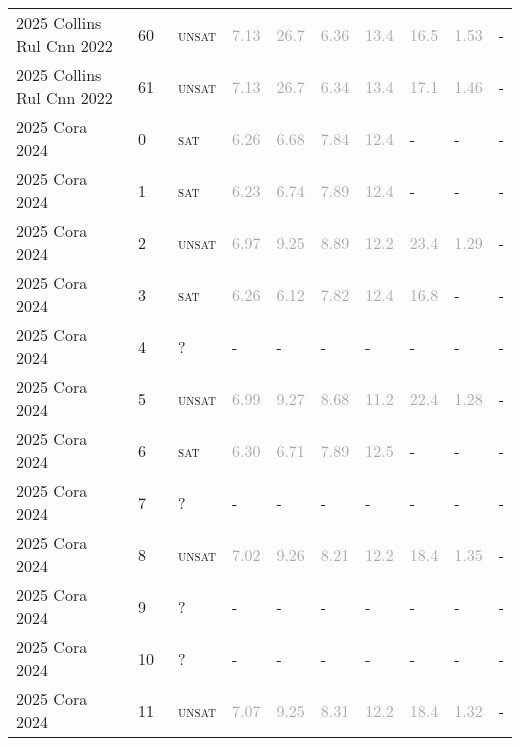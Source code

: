 \begin{center}
{\begin{longtable}{@{}llllllllll@{}}
2025 Collins Rul Cnn 2022 & 60 & ~\textsc{unsat} & \textcolor{darkgray}{7.13} & \textcolor{darkgray}{26.7} & \textcolor{darkgray}{6.36} & \textcolor{darkgray}{13.4} & \textcolor{darkgray}{16.5} & \textcolor{darkgray}{1.53} & - \\
2025 Collins Rul Cnn 2022 & 61 & ~\textsc{unsat} & \textcolor{darkgray}{7.13} & \textcolor{darkgray}{26.7} & \textcolor{darkgray}{6.34} & \textcolor{darkgray}{13.4} & \textcolor{darkgray}{17.1} & \textcolor{darkgray}{1.46} & - \\
\midrule
2025 Cora 2024 & 0 & ~\textsc{sat} & \textcolor{darkgray}{6.26} & \textcolor{darkgray}{6.68} & \textcolor{darkgray}{7.84} & \textcolor{darkgray}{12.4} & - & - & - \\
2025 Cora 2024 & 1 & ~\textsc{sat} & \textcolor{darkgray}{6.23} & \textcolor{darkgray}{6.74} & \textcolor{darkgray}{7.89} & \textcolor{darkgray}{12.4} & - & - & - \\
2025 Cora 2024 & 2 & ~\textsc{unsat} & \textcolor{darkgray}{6.97} & \textcolor{darkgray}{9.25} & \textcolor{darkgray}{8.89} & \textcolor{darkgray}{12.2} & \textcolor{darkgray}{23.4} & \textcolor{darkgray}{1.29} & - \\
2025 Cora 2024 & 3 & ~\textsc{sat} & \textcolor{darkgray}{6.26} & \textcolor{darkgray}{6.12} & \textcolor{darkgray}{7.82} & \textcolor{darkgray}{12.4} & \textcolor{darkgray}{16.8} & - & - \\
2025 Cora 2024 & 4 & ~? & - & - & - & - & - & - & - \\
2025 Cora 2024 & 5 & ~\textsc{unsat} & \textcolor{darkgray}{6.99} & \textcolor{darkgray}{9.27} & \textcolor{darkgray}{8.68} & \textcolor{darkgray}{11.2} & \textcolor{darkgray}{22.4} & \textcolor{darkgray}{1.28} & - \\
2025 Cora 2024 & 6 & ~\textsc{sat} & \textcolor{darkgray}{6.30} & \textcolor{darkgray}{6.71} & \textcolor{darkgray}{7.89} & \textcolor{darkgray}{12.5} & - & - & - \\
2025 Cora 2024 & 7 & ~? & - & - & - & - & - & - & - \\
2025 Cora 2024 & 8 & ~\textsc{unsat} & \textcolor{darkgray}{7.02} & \textcolor{darkgray}{9.26} & \textcolor{darkgray}{8.21} & \textcolor{darkgray}{12.2} & \textcolor{darkgray}{18.4} & \textcolor{darkgray}{1.35} & - \\
2025 Cora 2024 & 9 & ~? & - & - & - & - & - & - & - \\
2025 Cora 2024 & 10 & ~? & - & - & - & - & - & - & - \\
2025 Cora 2024 & 11 & ~\textsc{unsat} & \textcolor{darkgray}{7.07} & \textcolor{darkgray}{9.25} & \textcolor{darkgray}{8.31} & \textcolor{darkgray}{12.2} & \textcolor{darkgray}{18.4} & \textcolor{darkgray}{1.32} & - \\

\end{longtable}}
\end{center}
